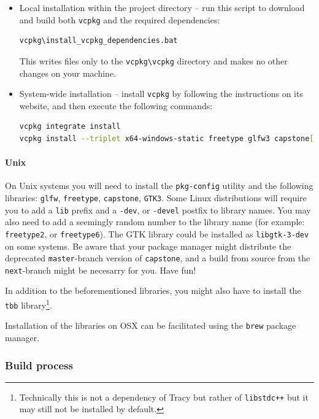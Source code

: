 \documentclass[hidelinks,titlepage,a4paper]{article}
\begin{document}
\begin{itemize}
\item Local installation within the project directory -- run this script to download and build both \texttt{vcpkg} and the required dependencies:
\begin{lstlisting}[language=sh]
vcpkg\install_vcpkg_dependencies.bat
\end{lstlisting}
This writes files only to the \texttt{vcpkg\textbackslash{}vcpkg} directory and makes no other changes on your machine.
\item System-wide installation -- install \texttt{vcpkg} by following the instructions on its website, and then execute the following commands:
\begin{lstlisting}[language=sh]
vcpkg integrate install
vcpkg install --triplet x64-windows-static freetype glfw3 capstone[arm,arm64,x86]
\end{lstlisting}
\end{itemize}

\paragraph{Unix}

On Unix systems you will need to install the \texttt{pkg-config} utility and the following libraries: \texttt{glfw}, \texttt{freetype}, \texttt{capstone}, \texttt{GTK3}. Some Linux distributions will require you to add a \texttt{lib} prefix and a \texttt{-dev}, or \texttt{-devel} postfix to library names. You may also need to add a seemingly random number to the library name (for example: \texttt{freetype2}, or \texttt{freetype6}). The GTK library could be installed as \texttt{libgtk-3-dev} on some systems. Be aware that your package manager might distribute the deprecated \texttt{master}-branch version of \texttt{capstone}, and a build from source from the \texttt{next}-branch might be necesarry for you. Have fun!

In addition to the beforementioned libraries, you might also have to install the \texttt{tbb} library\footnote{Technically this is not a dependency of Tracy but rather of \texttt{libstdc++} but it may still not be installed by default.}.

Installation of the libraries on OSX can be facilitated using the \texttt{brew} package manager.

\subsubsection{Build process}
\end{document}
